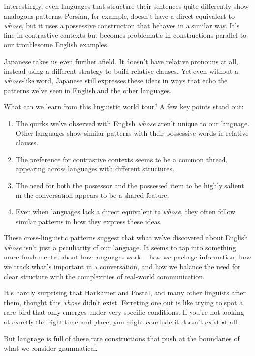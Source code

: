 Interestingly, even languages that structure their sentences quite differently show analogous patterns. Persian, for example, doesn't have a direct equivalent to \textit{whose}, but it uses a possessive construction that behaves in a similar way. It's fine in contrastive contexts but becomes problematic in constructions parallel to our troublesome English examples.

Japanese takes us even further afield. It doesn't have relative pronouns at all, instead using a different strategy to build relative clauses. Yet even without a \textit{whose}-like word, Japanese still expresses these ideas in ways that echo the patterns we've seen in English and the other languages.

What can we learn from this linguistic world tour? A few key points stand out:

\begin{enumerate}
    \item The quirks we've observed with English \textit{whose} aren't unique to our language. Other languages show similar patterns with their possessive words in relative clauses.

    \item The preference for contrastive contexts seems to be a common thread, appearing across languages with different structures.

    \item The need for both the possessor and the possessed item to be highly salient in the conversation appears to be a shared feature.

    \item Even when languages lack a direct equivalent to \textit{whose}, they often follow similar patterns in how they express these ideas.
\end{enumerate}

These cross-linguistic patterns suggest that what we've discovered about English \textit{whose} isn't just a peculiarity of our language. It seems to tap into something more fundamental about how languages work -- how we package information, how we track what's important in a conversation, and how we balance the need for clear structure with the complexities of real-world communication.

\bigskip

It's hardly surprising that Hankamer and Postal, and many other linguists after them, thought this \textit{whose} didn't exist. Ferreting one out is like trying to spot a rare bird that only emerges under very specific conditions. If you're not looking at exactly the right time and place, you might conclude it doesn't exist at all.

But language is full of these rare constructions that push at the boundaries of what we consider grammatical.